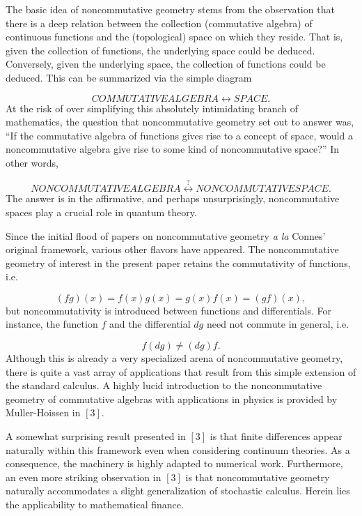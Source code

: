 \documentclass[preprint, 5p, 10pt]{elsarticle}
\theoremstyle{plain}
\begin{document}
The basic idea of noncommutative geometry stems from the observation that there is a deep relation between the collection 
(commutative algebra) of continuous functions and the (topological) space on which they reside. That is, given the collection of 
functions, the underlying space could be deduced. Conversely, given the underlying space, the collection of functions could be deduced. 
This can be summarized via the simple diagram

\begin{displaymath}
COMMUTATIVE ALGEBRA\leftrightarrow SPACE.
\end{displaymath}
At the risk of over simplifying this absolutely intimidating branch of mathematics, the question that noncommutative geometry set out to answer was, ``{}If the commutative algebra of functions gives rise to a concept of space, would a noncommutative algebra give rise to some kind of noncommutative space?''{} In other words,

\begin{displaymath}
NONCOMMUTATIVE ALGEBRA\stackrel{?}{\leftrightarrow} NONCOMMUTATIVE SPACE.
\end{displaymath}
The answer is in the affirmative, and perhaps unsurprisingly, noncommutative spaces play a crucial role in quantum theory.

Since the initial flood of papers on noncommutative geometry \emph{a la} Connes'{} original framework, various other flavors have appeared. The noncommutative geometry of interest in the present paper retains the commutativity of functions, i.e.

\begin{displaymath}
(f g)(x) = f(x)g(x) = g(x)f(x) = (g f)(x),
\end{displaymath}
but noncommutativity is introduced between functions and differentials. For instance, the function $f$ and the differential $d g$
 need not commute in general, i.e.

\begin{displaymath}
f(d g)\ne (d g)f.
\end{displaymath}
Although this is already a very specialized arena of noncommutative geometry, there is quite a vast array of applications that result from this simple extension of the standard calculus. A highly lucid introduction to the noncommutative geometry of commutative algebras with applications in physics is provided by Muller-Hoissen in $[3]$.

A somewhat surprising result presented in $[3]$ is that finite differences appear naturally within this framework even when considering 
continuum theories. As a consequence, the machinery is highly adapted to numerical work. Furthermore, an even more striking observation in
 $[3]$ is that noncommutative geometry naturally accommodates a slight generalization of stochastic calculus. Herein lies the applicability
 to mathematical finance.
\end{document}
